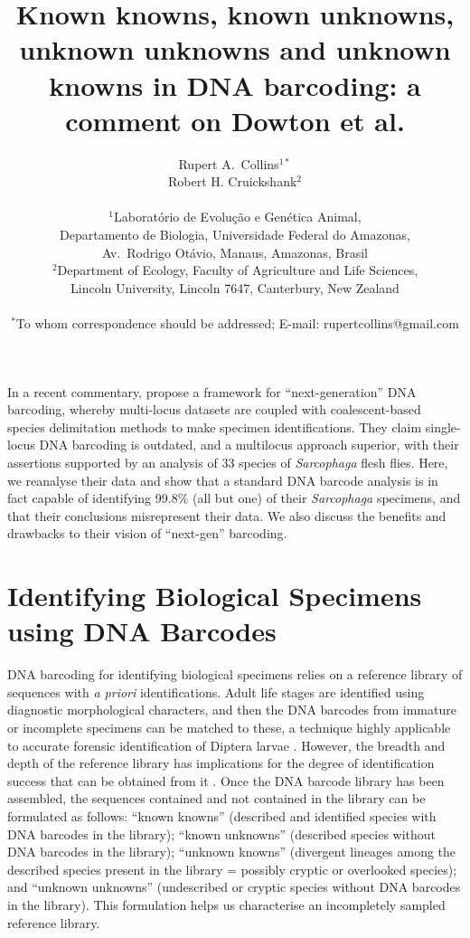 \documentclass[12pt]{article}
\title{\bf Known knowns, known unknowns, unknown unknowns and unknown knowns in DNA barcoding: a comment on Dowton et al.}
\author
{Rupert A.\ Collins$^{1*}$\\
Robert H. Cruickshank$^{2}$\\
\\
\normalsize{$^{1}$Laborat\'orio de Evolu\c c\~ao e Gen\'etica Animal,}\\
\normalsize{Departamento de Biologia, Universidade Federal do Amazonas,}\\
\normalsize{Av.\ Rodrigo Ot\'avio, Manaus, Amazonas, Brasil}\\
\normalsize{$^{2}$Department of Ecology, Faculty of Agriculture and Life Sciences,}\\
\normalsize{Lincoln University,  Lincoln 7647,  Canterbury, New Zealand}\\
\\
\normalsize{$^\ast$To whom correspondence should be addressed; E-mail:  rupertcollins@gmail.com}
}
\date{}
\begin{document}
 
\maketitle 

In a recent commentary, \citet{Dowton2014} propose a framework for ``next-generation'' DNA barcoding, whereby multi-locus datasets are coupled with coalescent-based species delimitation methods to make specimen identifications. They claim single-locus DNA barcoding is outdated, and a multilocus approach superior, with their assertions supported by an analysis of 33 species of \emph{Sarcophaga} flesh flies. Here, we reanalyse their data and show that a standard DNA barcode analysis is in fact capable of identifying 99.8\% (all but one) of their \emph{Sarcophaga} specimens, and that their conclusions misrepresent their data. We also discuss the benefits and drawbacks to their vision of ``next-gen'' barcoding.

\section*{Identifying Biological Specimens using DNA Barcodes}

DNA barcoding for identifying biological specimens relies on a reference library of sequences with \emph{a priori} identifications. Adult life stages are identified using diagnostic morphological characters, and then the DNA barcodes from immature or incomplete specimens can be matched to these, a technique highly applicable to accurate forensic identification of Diptera larvae \citep{Meiklejohn2011}. However, the breadth and depth of the reference library has implications for the degree of identification success that can be obtained from it \citep{Bergsten2012,Virgilio2012,Zhang2012b}. Once the DNA barcode library has been assembled, the sequences contained and not contained in the library can be formulated as follows: ``known knowns'' (described and identified species with DNA barcodes in the library); ``known unknowns'' (described species without DNA barcodes in the library); ``unknown knowns'' (divergent lineages among the described species present in the library = possibly cryptic or overlooked species); and ``unknown unknowns'' (undescribed or cryptic species without DNA barcodes in the library). This formulation helps us characterise an incompletely sampled reference library.
\end{document}
